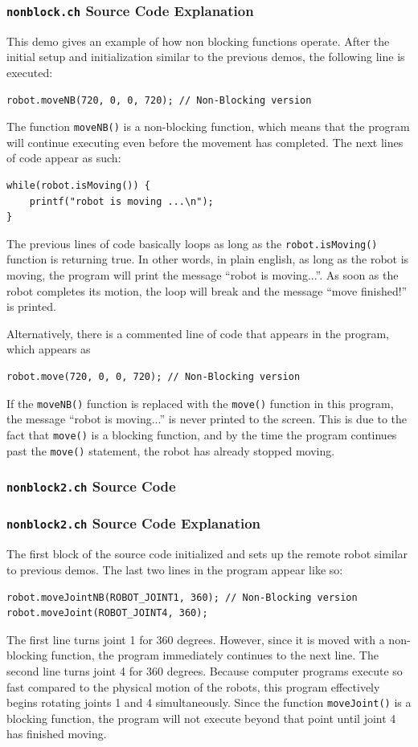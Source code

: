 \documentclass{article}
\begin{document}
\subsubsection{\texttt{nonblock.ch} Source Code Explanation}
This demo gives an example of how non blocking functions operate. 
After the initial setup and initialization similar to the previous
demos, the following line is executed:
\begin{verbatim}
robot.moveNB(720, 0, 0, 720); // Non-Blocking version
\end{verbatim}
The function \texttt{moveNB()} is a non-blocking function, which means
that the program will continue executing even before the movement
has completed. The next lines of code appear as such:
\begin{verbatim}
while(robot.isMoving()) {
    printf("robot is moving ...\n");
}
\end{verbatim}
The previous lines of code basically loops as long as the \texttt{robot.isMoving()} function
is returning true. In other words, in plain english, as long as the robot is moving,
the program will print the message ``robot is moving...''. As soon as the robot completes
its motion, the loop will break and the message ``move finished!'' is printed.

Alternatively, there is a commented line of code that appears in the program, which
appears as
\begin{verbatim}
robot.move(720, 0, 0, 720); // Non-Blocking version
\end{verbatim}
If the \texttt{moveNB()} function is replaced with the \texttt{move()} function in this program,
the message ``robot is moving...'' is never printed to the screen. This is due to the
fact that \texttt{move()} is a blocking function, and by the time the program continues past
the \texttt{move()} statement, the robot has already stopped moving.

\subsubsection{\texttt{nonblock2.ch} Source Code}

\subsubsection{\texttt{nonblock2.ch} Source Code Explanation}
The first block of the source code initialized and sets up the remote robot 
similar to previous demos. The last two lines in the program appear like so:
\begin{verbatim}
robot.moveJointNB(ROBOT_JOINT1, 360); // Non-Blocking version
robot.moveJoint(ROBOT_JOINT4, 360);
\end{verbatim}
The first line turns joint 1 for 360 degrees. However, since it is moved with a non-blocking function,
the program immediately continues to the next line. The second line turns joint 4 for
360 degrees. Because computer programs execute so fast compared to the physical
motion of the robots, this program effectively begins rotating joints 1 and 4 
simultaneously. Since the function \texttt{moveJoint()} is a blocking function,
the program will not execute beyond that point until joint 4 has finished moving.
\end{document}
